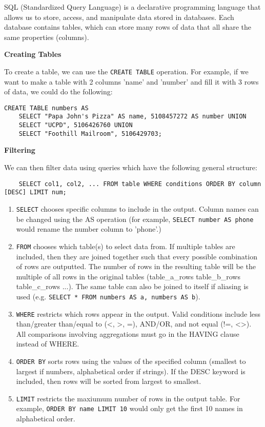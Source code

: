 SQL (Standardized Query Language) is a declarative programming language that allows us to store, access, and manipulate data stored in databases.
Each database contains tables, which can store many rows of data that all share the same properties (columns). 


\textbf{Creating Tables}

To create a table, we can use the \texttt{CREATE TABLE} operation. For example, if we want to make a table with 2 columns 'name' and 'number' and fill it with 3 rows of data, we could do the following:
\newline

\begin{lstlisting}
CREATE TABLE numbers AS
    SELECT "Papa John's Pizza" AS name, 5108457272 AS number UNION
    SELECT "UCPD", 5106426760 UNION
    SELECT "Foothill Mailroom", 5106429703;
\end{lstlisting}
\newpage

\textbf{Filtering}

We can then filter data using queries which have the following general structure:
\begin{lstlisting}
    SELECT col1, col2, ... FROM table WHERE conditions ORDER BY column [DESC] LIMIT num;
\end{lstlisting}
\begin{enumerate}
    \item \texttt{SELECT} chooses specific columns to include in the output. Column names can be changed using the AS operation (for example, \texttt{SELECT number AS phone} would rename the number column to 'phone'.)
    \item \texttt{FROM} chooses which table(s) to select data from. If multiple tables are included, then they are joined together such that every possible combination of rows are outputted. The number of rows in the resulting table will be the multiple of all rows in the original tables (table\_a\_rows \* table\_b\_rows \* table\_c\_rows \* ...). The same table can also be joined to itself if aliasing is used (e.g. \texttt{SELECT * FROM numbers AS a, numbers AS b}).
    \item \texttt{WHERE} restricts which rows appear in the output. Valid conditions include less than/greater than/equal to (\textless, \textgreater, =), AND/OR, and not equal (!=, \textless\textgreater). All comparisons involving aggregations must go in the HAVING clause instead of WHERE.
    \item \texttt{ORDER BY} sorts rows using the values of the specified column (smallest to largest if numbers, alphabetical order if strings). If the DESC keyword is included, then rows will be sorted from largest to smallest.
    \item \texttt{LIMIT} restricts the maxiumum number of rows in the output table. For example, \texttt{ORDER BY name LIMIT 10} would only get the first 10 names in alphabetical order.
\end{enumerate}

